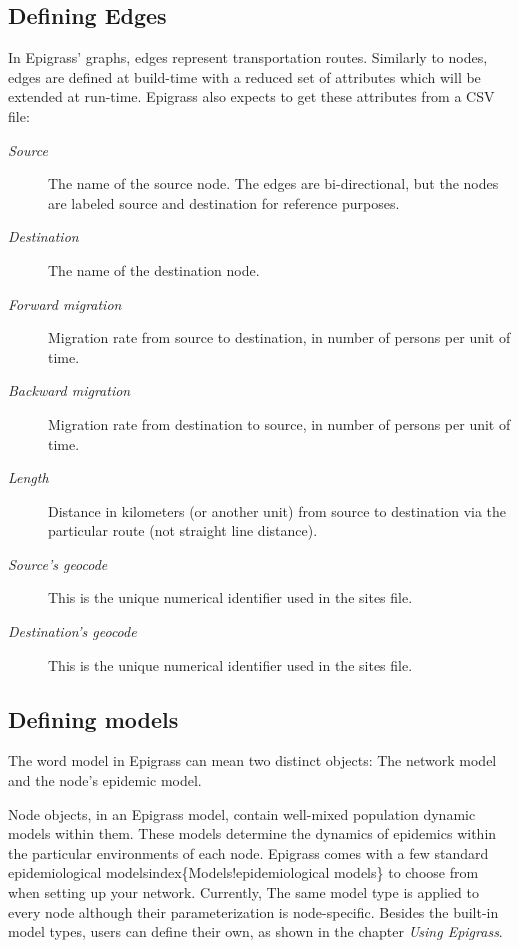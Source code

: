 \documentclass[a4paper,10pt,english]{sphinxmanual}
\begin{document}
\subsection{Defining Edges}
\label{overview:defining-edges}\label{overview:index-2}
In Epigrass' graphs, edges represent transportation routes. Similarly to nodes, edges are defined at build-time with a reduced set of attributes which will be extended at run-time. Epigrass also expects to get these attributes from a CSV file:
\begin{description}
\item[{\emph{Source}}] \leavevmode
The name of the source node. The edges are bi-directional, but the nodes are labeled source and destination for reference purposes.

\item[{\emph{Destination}}] \leavevmode
The name of the destination node.

\item[{\emph{Forward migration}}] \leavevmode
Migration rate from source to destination, in number of persons per unit of time.

\item[{\emph{Backward migration}}] \leavevmode
Migration rate from destination to source, in number of persons per unit of time.

\item[{\emph{Length}}] \leavevmode
Distance in kilometers (or another unit) from source to destination via the particular route (not straight line distance).

\item[{\emph{Source's geocode}}] \leavevmode
This is the unique numerical identifier used in the sites file.

\item[{\emph{Destination's geocode}}] \leavevmode
This is the unique numerical identifier used in the sites file.

\end{description}


\subsection{Defining models}
\label{overview:index-3}\label{overview:defining-models}
The word model in Epigrass can mean two distinct objects: The network model and the node's epidemic model.

Node objects, in an Epigrass model, contain well-mixed population dynamic models within them. These models determine the dynamics of epidemics within the particular environments of each node. Epigrass comes with a few standard epidemiological modelsindex\{Models!epidemiological models\} to choose from when setting up your network. Currently, The same model type is applied to every node although their parameterization is node-specific. Besides the built-in model types, users can define their own, as shown in the chapter \emph{Using Epigrass}.
\end{document}
